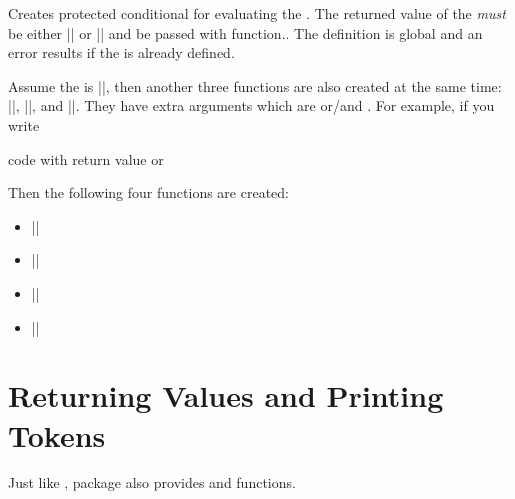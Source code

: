\documentclass[oneside]{book}
\begin{document}
\begin{function}{\PrgNewConditional}
\begin{syntax}
   
\end{syntax}
Creates protected conditional  for evaluating the .
The returned value of the  \emph{must} be either |\cTrueBool|
or |\cFalseBool| and be passed with  function..
The definition is global and an error results if the  is already defined.
\par
Assume the  is |\FooIfBar|, then another three functions
are also created at the same time: |\FooIfBarT|, |\FooIfBarF|, and |\FooIfBarTF|.
They have extra arguments which are  or/and .
For example, if you write
\begin{codehigh}
\PrgNewConditional {} {code with return value \cTrueBool or \cFalseBool}
\end{codehigh}
Then the following four functions are created:
\begin{itemize}
 \item |\FooIfBar|  
 \item |\FooIfBarT|   
 \item |\FooIfBarF|   
 \item |\FooIfBarTF|    
\end{itemize}
\end{function}

\section{Returning Values and Printing Tokens}

Just like \LuaTeX,  package also provides  and  functions.
\end{document}
